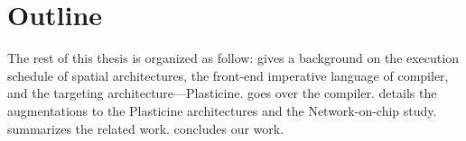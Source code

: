 

\section{Outline}
The rest of this thesis is organized as follow:
 gives a background on the execution schedule of spatial
architectures, the front-end imperative language of \name compiler, and the targeting
architecture---Plasticine.
 goes over the \name compiler.
 details the augmentations to the Plasticine architectures and the
Network-on-chip study.
 summarizes the related work.
 concludes our work.
